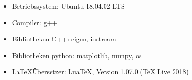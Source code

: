 \begin{itemize}
  \item Betriebssystem: Ubuntu 18.04.02 LTS
  \item Compiler: g++
  \item Bibliotheken C++: eigen, iostream
  \item Bibliotheken python: matplotlib, numpy, os
  \item \LaTeX Übersetzer: LuaTeX, Version 1.07.0 (TeX Live 2018)
\end{itemize}
